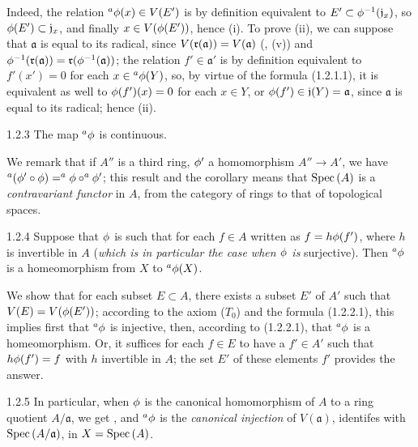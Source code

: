 Indeed, the relation $^a\phi(x)\in V(E')$ is by definition equivalent to
$E'\subset\phi^{-1}(\mathfrak{j}_x)$, so $\phi(E')\subset\mathfrak{j}_x$, and
finally $x\in V(\phi(E'))$, hence (i). To prove (ii), we can suppose that
$\mathfrak{a}$ is equal to its radical, since $V(\mathfrak{r}(\mathfrak{a}))=V(\mathfrak{a})$
(, (v)) and
$\phi^{-1}(\mathfrak{r}(\mathfrak{a}))=\mathfrak{r}(\phi^{-1}(\mathfrak{a}))$; the relation
$f'\in\mathfrak{a}'$ is by definition equivalent to $f'(x')=0$ for each
$x\in{^a\phi(Y)}$, so, by virtue of the formula (1.2.1.1), it is equivalent as well
to $\phi(f')(x)=0$ for each $x\in Y$, or $\phi(f')\in\mathfrak{j}(Y)=\mathfrak{a}$,
since $\mathfrak{a}$ is equal to its radical; hence (ii).

\begin{envs}[Corollary]{1.2.3}
\label{cor-1.1.2.3}
The map $^a\phi$ is continuous.
\end{envs}

We remark that if $A''$ is a third ring, $\phi'$ a homomorphism $A''\to A'$, we have
$^a(\phi'\circ\phi)= ^a\phi\circ ^a\phi'$; this result and the corollary
 means that ${\mathop{\mathrm{Spec}}\nolimits}\,(A)$ is a \emph{contravariant functor} in $A$, from the
category of rings to that of topological spaces.

\begin{envs}[Corollary]{1.2.4}
\label{cor-1.1.2.4}
Suppose that $\phi$ is such that for each $f\in A$ written as $f=h\phi(f')$, where $h$ is
invertible in $A$ (\emph{which is in particular the case when $\phi$ is} surjective). Then
$^a\phi$ is a homeomorphism from $X$ to $^a\phi(X)$.
\end{envs}

We show that for each subset $E\subset A$, there exists a subset $E'$ of $A'$ such that
$V(E)=V(\phi(E'))$; according to the axiom ($T_0$)  and the formula
(1.2.2.1), this implies first that $^a\phi$ is injective, then, according to (1.2.2.1),
that $^a\phi$ is a homeomorphism. Or, it suffices for each $f\in E$ to have a $f'\in A'$
such that $h\phi(f')=f$ with $h$ invertible in $A$; the set $E'$ of these elements $f'$
provides the answer.

\begin{env}{1.2.5}
\label{env-1.1.2.5}
In particular, when $\phi$ is the canonical homomorphism of $A$ to a ring quotient
$A/\mathfrak{a}$, we get , and $^a\phi$ is the \emph{canonical injection}
of $V(\mathfrak{a})$, identifes with ${\mathop{\mathrm{Spec}}\nolimits}\,(A/\mathfrak{a})$, in $X={\mathop{\mathrm{Spec}}\nolimits}\,(A)$.
\end{env}

